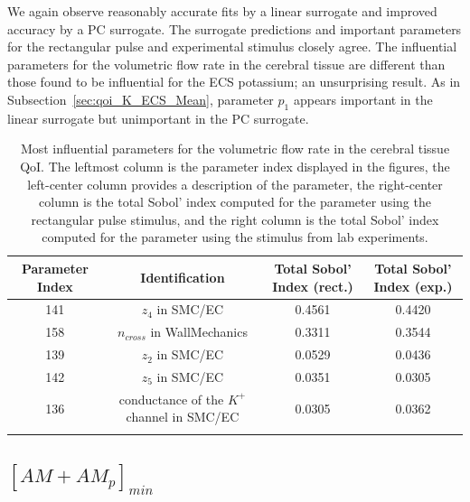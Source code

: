 We again observe reasonably accurate fits by a linear surrogate and improved accuracy by a PC surrogate. The surrogate predictions and important parameters for the rectangular pulse and experimental stimulus closely agree. The influential parameters for the volumetric flow rate in the cerebral tissue are different than those found to be influential for the ECS potassium; an unsurprising result. As in Subsection~\ref{sec:qoi_K_ECS_Mean}, parameter $p_1$ appears important in the linear surrogate but unimportant in the PC surrogate.

\begin{table}[h]
\centering
{}
\begin{tabular}{cccc}
\toprule
Parameter Index & Identification & Total Sobol' Index (rect.) & Total Sobol' Index (exp.)\\
\midrule
141 &  $z_4$ in SMC/EC & 0.4561 & 0.4420\\
158 & $n_{cross}$ in WallMechanics & 0.3311 & 0.3544\\ 
 139 & $z_2$ in SMC/EC & 0.0529 & 0.0436\\
 142 & $z_5$ in SMC/EC &  0.0351 &0.0305\\
  136 & conductance of the $K^+$ channel in SMC/EC & 0.0305 &0.0362\\
   \arrayrulecolor{black}\bottomrule
\end{tabular}
\caption{Most influential parameters for the volumetric flow rate in the cerebral tissue QoI. The leftmost column is the parameter index displayed in the figures, the left-center column provides a description of the parameter, the right-center column is the total Sobol' index computed for the parameter using the rectangular pulse stimulus, and the right column is the total Sobol' index computed for the parameter using the stimulus from lab experiments.}
\label{tab:qoi_vol_flow}
\end{table}

\subsection{$[AM+AM_p]_{min}$}

